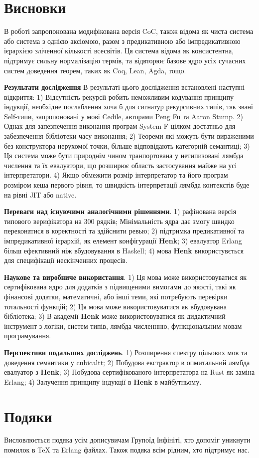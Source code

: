 \documentclass{article}
\begin{document}
\section{Висновки}
В роботі запропонована модифікована версія CoC, також відома як чиста система або система з однією аксіомою, разом
з предикативною або імпредикативною ієрархією зліченної кількості всесвітів. Ця система відома як консистентна,
підтримує сильну нормалізацію термів, та відвторює базове ядро усіх сучасних систем доведення теорем, таких як Coq, Lean, Agda, тощо.

{\bf Результати дослідження}
В результаті цього дослідження встановлені наступні відкриття:
1) Відсутність рекурсії робить неможливим кодування принципу індукції, необхідне послаблення хоча б для сигнатур
   рекурсивних типів, так звані Self-типи, запропоновані у мові Cedile, авторами Peng Fu та Aaron Stump\cite{Fu14}.
2) Однак для запезпечення виконання програм System F цілком достатньо для забезпечення бібліотеки часу виконання;
2) Теореми які можуть бути вираженими без конструктора нерухомої точки, більше відповідають категорній семантиці;
3) Ця система може бути природнім чином транпортована у нетипизовані лямбда числення та їх евалуатори, що розширює
   область застосування майже на усі інтерпретатори.
4) Якщо обмежити розмір інтерпретатор та його програм розміром кеша первого рівня,
   то швидкість інтерпретації лямбда контекстів буде на рівні JIT або native.

{\bf Переваги над існуючими аналогічними рішеннями}.
1) рафінована версія типового верифікатора на 300 рядків; Мінімальність ядра дає змогу швидко переконатися в коректності та здійснити ревью;
2) підтримка предикативної та імпредикативної ієрархій, як елемент конфігурації {\bf Henk};
3) евалуатор Erlang більш ефективний ніж вбудовування в Haskell;
4) мова {\bf Henk} використувється для специфікації нескінченних процесів.

{\bf Наукове та виробниче використання}.
1) Ця мова може використовуватися як сертифікована ядро для додатків з підвищеними вимогами до якості,
такі як фінансові додатки, математичні, або інші теми, які потребують перевірки тотальності функцій;
2) Ця мова може використовуватися як вбудовувана бібліотека;
3) В академії {\bf Henk} може використовуватися як дидактичний інструмент з логіки, систем типів, лямбда численнню, функціональним мовам програмування.

{\bf Перспективи подальших досліджень}.
1) Розширення спектру цільових мов та доведення семантики у cubicaltt;
2) Побудова екстрактор в опмитальний лямбда евалуатор з {\bf Henk};
3) Побудова сертифікованого інтерпретатора на Rust як заміна Erlang;
4) Залучення принципу індукції в {\bf Henk} в майбутньому.

\section{Подяки}
Висловлюється подяка усім дописувичам Групоїд Інфініті, хто допоміг уникнути помилок в TeX та Erlang файлах.
Також подяка всім рідним, хто підтримує нас.



\end{document}
